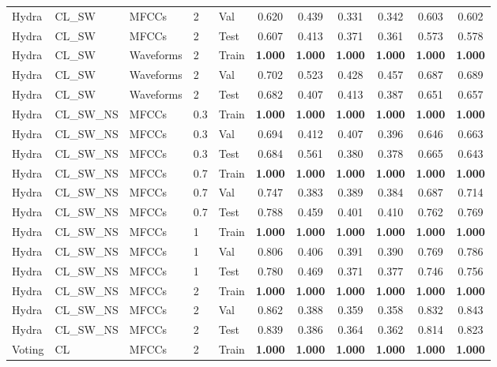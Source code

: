 \begin{landscape}
\begin{longtable}{|l|l|l|l|l|c|c|c|c|c|c|}
Hydra & CL\_SW & MFCCs & 2 & Val & 0.620 & 0.439 & 0.331 & 0.342 & 0.603 & 0.602 \\
Hydra & CL\_SW & MFCCs & 2 & Test & 0.607 & 0.413 & 0.371 & 0.361 & 0.573 & 0.578 \\
Hydra & CL\_SW & Waveforms & 2 & Train & \textbf{1.000} & \textbf{1.000} & \textbf{1.000} & \textbf{1.000} & \textbf{1.000} & \textbf{1.000} \\
Hydra & CL\_SW & Waveforms & 2 & Val & 0.702 & 0.523 & 0.428 & 0.457 & 0.687 & 0.689 \\
Hydra & CL\_SW & Waveforms & 2 & Test & 0.682 & 0.407 & 0.413 & 0.387 & 0.651 & 0.657 \\
Hydra & CL\_SW\_NS & MFCCs & 0.3 & Train & \textbf{1.000} & \textbf{1.000} & \textbf{1.000} & \textbf{1.000} & \textbf{1.000} & \textbf{1.000} \\
Hydra & CL\_SW\_NS & MFCCs & 0.3 & Val & 0.694 & 0.412 & 0.407 & 0.396 & 0.646 & 0.663 \\
Hydra & CL\_SW\_NS & MFCCs & 0.3 & Test & 0.684 & 0.561 & 0.380 & 0.378 & 0.665 & 0.643 \\
Hydra & CL\_SW\_NS & MFCCs & 0.7 & Train & \textbf{1.000} & \textbf{1.000} & \textbf{1.000} & \textbf{1.000} & \textbf{1.000} & \textbf{1.000} \\
Hydra & CL\_SW\_NS & MFCCs & 0.7 & Val & 0.747 & 0.383 & 0.389 & 0.384 & 0.687 & 0.714 \\
Hydra & CL\_SW\_NS & MFCCs & 0.7 & Test & 0.788 & 0.459 & 0.401 & 0.410 & 0.762 & 0.769 \\
Hydra & CL\_SW\_NS & MFCCs & 1 & Train & \textbf{1.000} & \textbf{1.000} & \textbf{1.000} & \textbf{1.000} & \textbf{1.000} & \textbf{1.000} \\
Hydra & CL\_SW\_NS & MFCCs & 1 & Val & 0.806 & 0.406 & 0.391 & 0.390 & 0.769 & 0.786 \\
Hydra & CL\_SW\_NS & MFCCs & 1 & Test & 0.780 & 0.469 & 0.371 & 0.377 & 0.746 & 0.756 \\
Hydra & CL\_SW\_NS & MFCCs & 2 & Train & \textbf{1.000} & \textbf{1.000} & \textbf{1.000} & \textbf{1.000} & \textbf{1.000} & \textbf{1.000} \\
Hydra & CL\_SW\_NS & MFCCs & 2 & Val & 0.862 & 0.388 & 0.359 & 0.358 & 0.832 & 0.843 \\
Hydra & CL\_SW\_NS & MFCCs & 2 & Test & 0.839 & 0.386 & 0.364 & 0.362 & 0.814 & 0.823 \\
Voting & CL & MFCCs & 2 & Train & \textbf{1.000} & \textbf{1.000} & \textbf{1.000} & \textbf{1.000} & \textbf{1.000} & \textbf{1.000} \\

\end{longtable}
\end{landscape}
